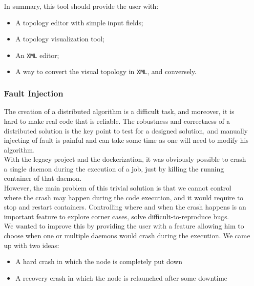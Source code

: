 \documentclass{eplmastersthesis}
\begin{document}
          In summary, this tool should provide the user with:

          \begin{itemize}
            \item A topology editor with simple input fields;
            \item A topology visualization tool;
            \item An \texttt{XML} editor;
            \item A way to convert the visual topology in \texttt{XML}, and conversely.
          \end{itemize}

        \subsubsection{Fault Injection}

          The creation of a distributed algorithm is a difficult task, and
          moreover, it is hard to make real code that is reliable. The robustness
          and correctness of a distributed solution is the key point to test
          for a designed solution, and manually injecting of fault is painful
          and can take some time as one will need to modify his algorithm.\\

          With the legacy project and the dockerization, it was obviously
          possible to crash a single daemon during the execution of a job, just
          by killing the running container of that daemon.\\
          However, the main problem of this trivial solution is that we cannot
          control where the crash may happen during the code execution, and
          it would require to stop and restart containers. Controlling where
          and when the crash happens is an important feature to explore
          corner cases, solve difficult-to-reproduce bugs.\\
          We wanted to improve this by providing the user with a feature
          allowing him to choose when one or multiple daemons would crash during
          the execution. We came up with two ideas:

          \begin{itemize}
            \item A hard crash in which the node is completely put down
            \item A recovery crash in which the node is relaunched after some
            downtime
          \end{itemize}
\end{document}
